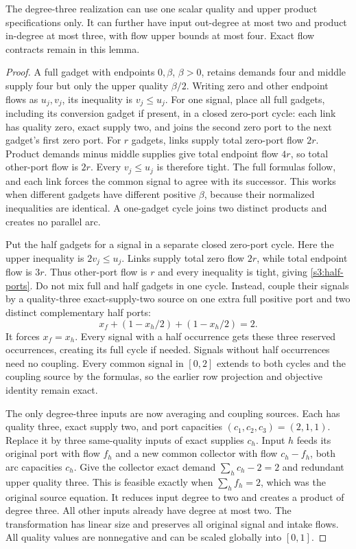 \begin{lemma}\label{s3:cycles}
The degree-three realization can use one scalar quality and upper product
specifications only. It can further have input out-degree at most two
and product in-degree at most three, with flow upper bounds at most four.
Exact flow contracts remain in this lemma.
\end{lemma}
\begin{proof}
A full gadget with endpoints $0,\beta$, $\beta>0$, retains demands
four and middle supply four but only the upper quality $\beta/2$.
Writing zero and other endpoint flows as $u_j,v_j$, its inequality is
$v_j\le u_j$. For one signal, place all full gadgets, including its
conversion gadget if present, in a closed zero-port cycle: each link
has quality zero, exact supply two, and joins the second zero port to
the next gadget's first zero port. For $r$ gadgets, links supply total
zero-port flow $2r$. Product demands minus middle supplies give total
endpoint flow $4r$, so total other-port flow is $2r$. Every
$v_j\le u_j$ is therefore tight. The full formulas follow, and each
link forces the common signal to agree with its successor. This works
when different gadgets have different positive $\beta$, because their
normalized inequalities are identical. A one-gadget cycle joins two
distinct products and creates no parallel arc.

Put the half gadgets for a signal in a separate closed zero-port cycle.
Here the upper inequality is $2v_j\le u_j$. Links supply total zero
flow $2r$, while total endpoint flow is $3r$. Thus other-port flow is
$r$ and every inequality is tight, giving \eqref{s3:half-ports}.
Do not mix full and half gadgets in one cycle. Instead, couple their
signals by a quality-three exact-supply-two source on one extra full
positive port and two distinct complementary half ports:
\[
 x_f+(1-x_h/2)+(1-x_h/2)=2.
\]
It forces $x_f=x_h$. Every signal with a half occurrence gets these
three reserved occurrences, creating its full cycle if needed. Signals
without half occurrences need no coupling. Every common signal in
$[0,2]$ extends to both cycles and the coupling source by the formulas,
so the earlier row projection and objective identity remain exact.

The only degree-three inputs are now averaging and coupling sources.
Each has quality three, exact supply two, and port capacities
$(c_1,c_2,c_3)=(2,1,1)$. Replace it by three same-quality inputs of
exact supplies $c_h$. Input $h$ feeds its original port with flow $f_h$
and a new common collector with flow $c_h-f_h$, both arc capacities
$c_h$. Give the collector exact demand $\sum_hc_h-2=2$ and redundant
upper quality three. This is feasible exactly when $\sum_hf_h=2$,
which was the original source equation. It reduces input degree to two
and creates a product of degree three. All other inputs already have
degree at most two. The transformation has linear size and preserves
all original signal and intake flows. All quality values are nonnegative
and can be scaled globally into $[0,1]$.
\end{proof}

